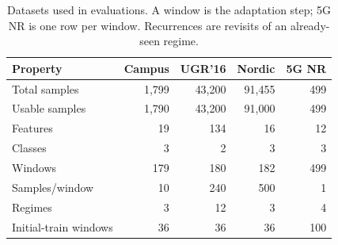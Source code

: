 \begin{table}[hbt!]
\small
\caption{Datasets used in evaluations. A window is the adaptation step; 5G NR is one row per window. Recurrences are revisits of an already-seen regime.}
\label{tab:datasets}
\centering
\begin{tabular}{@{}lrrrr@{}}
\toprule
\textbf{Property} & \textbf{Campus} & \textbf{UGR'16} & \textbf{Nordic} & \textbf{5G NR}\\
\midrule
Total samples & 1,799 & 43,200 & 91,455 & 499 \\
Usable samples & 1,790 & 43,200 & 91,000 & 499 \\
Features & 19 & 134 & 16 & 12 \\
Classes & 3 & 2 & 3 & 3 \\
Windows & 179 & 180 & 182 & 499 \\
Samples/window & 10 & 240 & 500 & 1 \\
Regimes & 3 & 12 & 3 & 4 \\
Initial-train windows & 36 & 36 & 36 & 100 \\
\bottomrule
\end{tabular}
\end{table}
